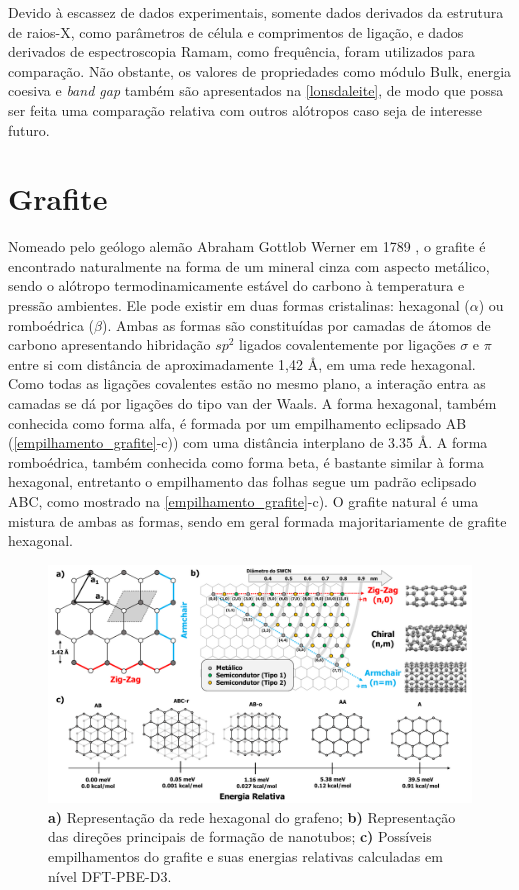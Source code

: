  		Devido à escassez de dados experimentais, somente dados derivados da estrutura de raios-X, como parâmetros de célula e comprimentos de ligação, e dados derivados de espectroscopia Ramam, como frequência, foram utilizados para comparação. Não obstante, os valores de propriedades como módulo Bulk, energia coesiva e \textit{band gap} também são apresentados na \autoref{lonsdaleite}, de modo que possa ser feita uma comparação relativa com outros alótropos caso seja de interesse futuro.
 		
 	
	\section{Grafite}

		Nomeado pelo geólogo alemão Abraham Gottlob Werner em 1789 \cite{frohs2000carbon}, o grafite é encontrado naturalmente na forma de um mineral cinza com aspecto metálico, sendo o alótropo termodinamicamente estável do carbono à temperatura e pressão ambientes. Ele pode existir em duas formas cristalinas: hexagonal ($\alpha$) ou romboédrica ($\beta$). Ambas as formas são constituídas por camadas de átomos de carbono apresentando hibridação $sp^2$ ligados covalentemente por ligações $\sigma$ e $\pi$ entre si com distância de aproximadamente 1,42 Å, em uma rede hexagonal. Como todas as ligações covalentes estão no mesmo plano, a interação entra as camadas se dá por ligações do tipo van der Waals. A forma hexagonal, também conhecida como forma alfa, é formada por um empilhamento eclipsado AB (\autoref{empilhamento_grafite}-c)) com uma distância interplano de 3.35 Å. A forma romboédrica, também conhecida como forma beta, é bastante similar à forma hexagonal, entretanto o empilhamento das folhas segue um padrão eclipsado ABC, como mostrado na \autoref{empilhamento_grafite}-c). O grafite natural é uma mistura de ambas as formas, sendo em geral formada majoritariamente de grafite hexagonal.\cite{burchell1999carbon}	
		
		\begin{figure}[!h]
			\centering
			\includegraphics[width=1\linewidth]{capitulos/fig/results0/empilhamento_grafite}
			\caption{\textbf{a)} Representação da rede hexagonal do grafeno; \textbf{b)} Representação das direções principais de formação de nanotubos; \textbf{c)} Possíveis empilhamentos do grafite e suas energias relativas calculadas em nível DFT-PBE-D3.}
			\label{empilhamento_grafite}
		\end{figure}
	
